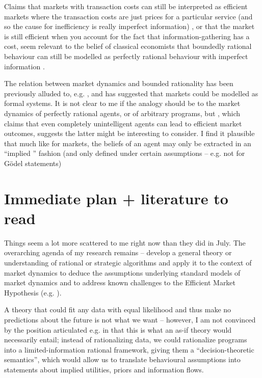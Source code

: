 \documentclass{article}
\begin{document}
\begin{itemize}
    Claims that markets with transaction costs can still be interpreted as efficient markets where the transaction costs are just prices for a particular service (and so the cause for inefficiency is really imperfect information) \cite{Cheung1970}, or that the market is still efficient when you account for the fact that information-gathering has a cost, seem relevant to the belief of classical economists that boundedly rational behaviour can still be modelled as perfectly rational behaviour with imperfect information \cite{Arrow2004, Gigerenzer2016, Echenique2011}.

    The relation between market dynamics and bounded rationality has been previously alluded to, e.g. \cite{Aumann1997}, and \cite{Wuppuluri2020Suwailem} has suggested that markets could be modelled as formal systems. It is not clear to me if the analogy should be to the market dynamics of perfectly rational agents, or of arbitrary programs, but \cite{Gode1993}, which claims that even completely unintelligent agents can lead to efficient market outcomes, suggests the latter might be interesting to consider. I find it plausible that much like for markets, the beliefs of an agent may only be extracted in an ``implied '' fashion (and only defined under certain assumptions -- e.g. not for G\"odel statements)
\end{itemize}

\section{Immediate plan + literature to read}

Things seem a lot more scattered to me right now than they did in July. The overarching agenda of my research remains -- develop a general theory or understanding of rational or strategic algorithms and apply it to the context of market dynamics to deduce the assumptions underlying standard models of market dynamics and to address known challenges to the Efficient Market Hypothesis (e.g. \cite{Monroe2009, Maymin2010, Milgrom2022, Xiaotie2008, Decheng2009, Paparas2017, Xi2009, Codenotti2006, Vazirani2011, Chen2009, Daskalakis2006, Yannakakis2010}). 

A theory that could fit any data with equal likelihood and thus make no predictions about the future is not what we want -- however, I am not convinced by the position articulated e.g. in \cite{Gigerenzer2016} that this is what an as-if theory would necessarily entail; instead of rationalizing data, we could rationalize programs into a limited-information rational framework, giving them a ``decision-theoretic semantics'', which would allow us to translate behavioural assumptions into statements about implied utilities, priors and information flows.
\end{document}
